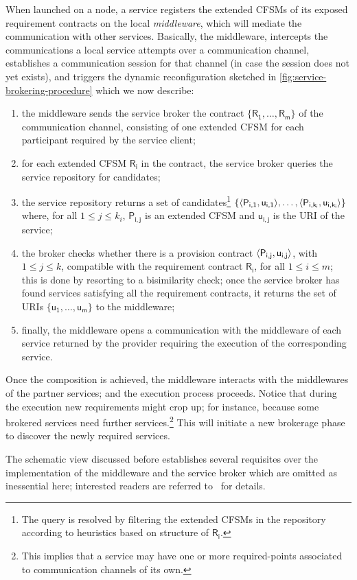 When launched on a \SEArch node, a service registers the extended
CFSMs of its exposed requirement contracts on the local
\emph{middleware}, which will mediate the communication with other
services.
%
Basically, the middleware, intercepts the communications a
local service attempts over a communication channel, establishes a
communication session for that channel (in case the session does not 
yet exists), and triggers the dynamic reconfiguration sketched in
\cref{fig:service-brokering-procedure} which we now describe:
%
\begin{enumerate}
  \newcommand{\blt}[1]{\raisebox{3pt}{\tikz{\node[circle,fill=black,text=white,inner sep=1pt, scale=.9]{#1}}}}
\item[\blt 1] the middleware sends the service broker the contract
  $\{\mathsf{R_1}, \ldots, \mathsf{R_m}\}$ of the communication
  channel, consisting of one extended CFSM for each participant
  required by the service client;
\item[\blt 2] for each extended CFSM $\mathsf{R_i}$ in the contract, the
  service broker queries the service repository for candidates;
\item[\blt 3] the service repository returns a set of candidates\footnote{%
	 The query is resolved by filtering the extended CFSMs in the
	 repository according to heuristics based on structure of
	 $\mathsf{R_i}$.
  }
  $\{\langle {\mathsf{P_{i, 1}}, \mathsf{u_{i, 1}}} \rangle, \ldots,
  \langle {\mathsf{P_{i, k_i}}, \mathsf{u_{i, k_i}}} \rangle\}$ where, for all
  $1 \leq j \leq k_i$, $\mathsf{P_{i, j}}$ is an extended CFSM and
  $\mathsf{u_{i, j}}$ is the URI of the service;
\item[\blt 4] the broker checks whether there is a provision contract $\langle {\mathsf{P_{i, j}}, \mathsf{u_{i, j}}} \rangle$, with $1 \leq j \leq k$,
  compatible with the requirement contract $\mathsf{R_i}$, for all $1 \leq i \leq m$; this is
  done by resorting to a bisimilarity check; once the service broker has
  found services satisfying all the requirement contracts, it returns
  the set of URIs $\{\mathsf{u_1}, \ldots, \mathsf{u_m}\}$ to the middleware;
\item[\blt 5] finally, the middleware opens a communication with the
  middleware of each service returned by the provider requiring the
  execution of the corresponding service.
\end{enumerate}
%
Once the composition is achieved, the middleware interacts with the
middlewares of the partner services; and the execution process
proceeds.
%
Notice that during the execution new requirements might crop up; for
instance, because some brokered services need further
services.\footnote{%
  This implies that a service may have one or more required-points
  associated to communication channels of its own.
}
% 
This will initiate a new brokerage phase to discover the newly
required services.

The schematic view discussed before establishes several requisites
over the implementation of the middleware and the service broker which
are omitted as inessential here; interested readers are referred
to~\cite{lopezpombo:coordination24} for details.


